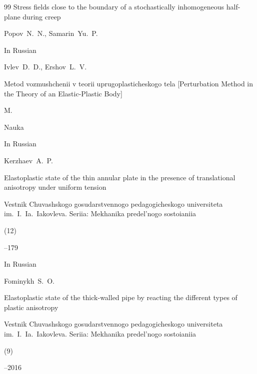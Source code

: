 \begin{thebibliography}{99}
\paper Stress fields close to the boundary of a stochastically inhomogeneous half-plane during creep

\by Popov~N.~N., Samarin~Yu.~P.







\lang In Russian

\by Ivlev~D.~D., Ershov~L.~V.

\book Metod vozmushchenii v teorii uprugoplasticheskogo tela \rm [Perturbation Method in the Theory of an Elastic-Plastic Body]

\publaddr M.

\publ Nauka






\lang In Russian

\by Kerzhaev~A.~P.

\paper Elastoplastic state of the thin annular plate in the presence of translational anisotropy under uniform tension

\jour Vestnik Chuvashskogo gosudarstvennogo pedagogicheskogo universiteta im.~I.~Ia.~Iakovleva. Seriia: Mekhanika predel'nogo sostoianiia


(12)

--179








\lang In Russian

\by Fominykh~S.~O.

\paper Elastoplastic state of the thick-walled pipe by reacting the different types of plastic anisotropy

\jour Vestnik Chuvashskogo gosudarstvennogo pedagogicheskogo universiteta im.~I.~Ia.~Iakovleva. Seriia: Mekhanika predel'nogo sostoianiia


(9)

--2016







\end{thebibliography}
